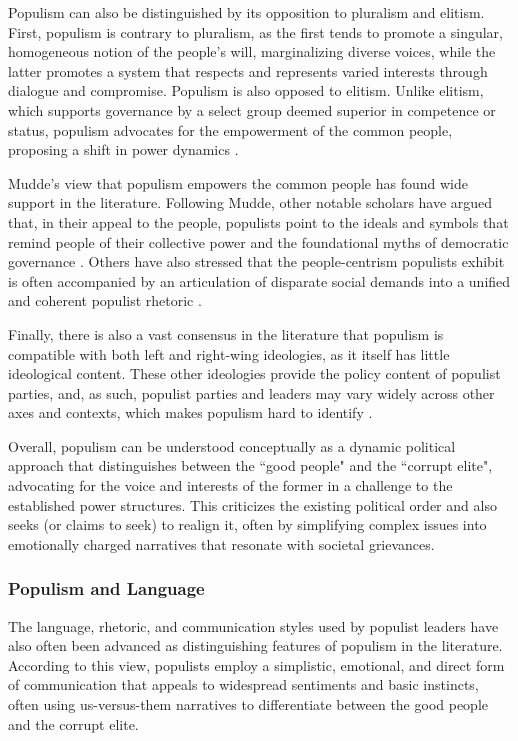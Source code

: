 \documentclass[12pt,letterpaper]{article}
\begin{document}
Populism can also be distinguished by its opposition to pluralism and elitism. First, populism is contrary to pluralism, as the first tends to promote a singular, homogeneous notion of the people's will, marginalizing diverse voices, while the latter promotes a system that respects and represents varied interests through dialogue and compromise. Populism is also opposed to elitism. Unlike elitism, which supports governance by a select group deemed superior in competence or status, populism advocates for the empowerment of the common people, proposing a shift in power dynamics \autocite{muddePopulismVeryShort2017} .

Mudde's view that populism empowers the common people has found wide support in the literature. Following Mudde, other notable scholars have argued that, in their appeal to the people, populists point to the ideals and symbols that remind people of their collective power and the foundational myths of democratic governance \autocite{canovanTrustPeoplePopulism1999}. Others have also stressed that the people-centrism populists exhibit is often accompanied by an articulation of disparate social demands into a unified and coherent populist rhetoric \autocite{benvenutoPopulistReasonErnesto2012} .

Finally, there is also a vast consensus in the literature that populism is compatible with both left and right-wing ideologies, as it itself has little ideological content. These other ideologies provide the policy content of populist parties, and, as such, populist parties and leaders may vary widely across other axes and contexts, which makes populism hard to identify\autocite{muddePopulistZeitgeist2004} .

Overall, populism can be understood conceptually as a dynamic political approach that distinguishes between the ``good people" and the ``corrupt elite", advocating for the voice and interests of the former in a challenge to the established power structures. This criticizes the existing political order and also  seeks (or claims to seek) to realign it, often by simplifying complex issues into emotionally charged narratives that resonate with societal grievances.

\vspace{.25cm}
\subsubsection{Populism and Language}

\vspace{.25cm}
\noindent The language, rhetoric, and communication styles used by populist leaders have also often been advanced as distinguishing features of populism in the literature. According to this view, populists employ a simplistic, emotional, and direct form of communication that appeals to widespread sentiments and basic instincts, often using us-versus-them narratives to differentiate between the good people and the corrupt elite. 
\end{document}
